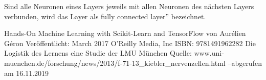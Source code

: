 \documentclass{article}
\begin{document}
Sind alle Neuronen eines Layers jeweils mit allen Neuronen des nächsten Layers verbunden, wird das Layer als \glqq fully connected layer'' bezeichnet.
\newpage
\begin{thebibliography}{99}
	Hands-On Machine Learning with Scikit-Learn and TensorFlow\newline
	von Aurélien Géron\newline
	Veröffentlicht: March 2017 O'Reilly Media, Inc\newline
	ISBN: 9781491962282
	Die Logistik des Lernens eine Studie der LMU München\newline
	Quelle: www.uni-muenchen.de/forschung/news/2013/\newline f-71-13\_kiebler\_nervenzellen.html --abgerufen am 16.11.2019
\end{thebibliography}
\listoffigures
\end{document}
